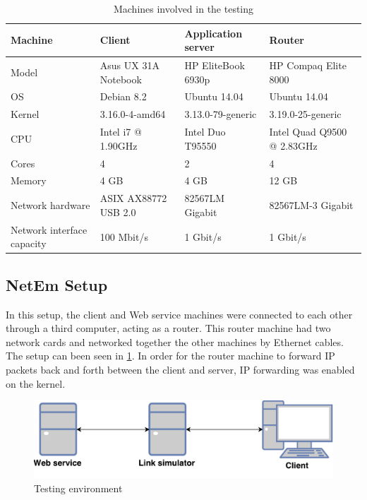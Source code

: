 \begin{table}[h]
\begin{tabularx}{\textwidth}{| l | X | X | X |}
\hline
  \textbf{Machine} & \textbf{Client} & \textbf{Application server} & \textbf{Router}\\ \hline
  Model & Asus UX 31A Notebook & HP EliteBook 6930p & HP Compaq Elite 8000 \\ \hline
  OS & Debian 8.2 & Ubuntu 14.04 & Ubuntu 14.04\\ \hline
  Kernel & 3.16.0-4-amd64 & 3.13.0-79-generic & 3.19.0-25-generic\\ \hline
  CPU & Intel i7 @ 1.90GHz & Intel Duo T95550 & Intel Quad Q9500 @ 2.83GHz \\ \hline
  Cores & 4 & 2 & 4\\ \hline
  Memory & 4 GB & 4 GB & 12 GB\\ \hline
  Network hardware & ASIX AX88772 USB 2.0 & 82567LM Gigabit & 82567LM-3 Gigabit\\ \hline
  Network interface capacity & 100 Mbit/s & 1 Gbit/s & 1 Gbit/s \\ \hline
\end{tabularx}
\caption{Machines involved in the testing}
\label{table-machines}
\end{table}

\subsection{NetEm Setup}

In this setup, the client and Web service machines were connected to each other
through a third computer, acting as a router. This router machine had two
network cards and networked together the other machines by Ethernet cables. The
setup can been seen in \cref{figure-testing-environment}. In order for the
router machine to forward IP packets back and forth between the client and
server, IP forwarding was enabled on the kernel.

\begin{figure}[h]
\includegraphics[scale=0.6]{images/testing_environment.pdf}
\caption{Testing environment}
\label{figure-testing-environment}
\end{figure}

